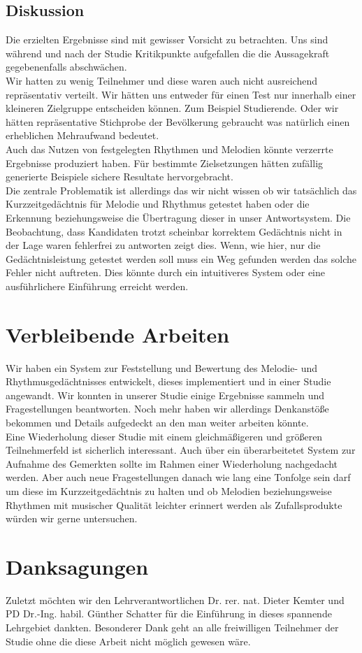 \documentclass{acm_proc_article-sp}
\begin{document}
\subsection{Diskussion}
Die erzielten Ergebnisse sind mit gewisser Vorsicht zu betrachten. Uns sind während und nach der Studie Kritikpunkte aufgefallen die die Aussagekraft gegebenenfalls abschwächen.\\
Wir hatten zu wenig Teilnehmer und diese waren auch nicht ausreichend repräsentativ verteilt. Wir hätten uns entweder für einen Test nur innerhalb einer kleineren Zielgruppe entscheiden können. Zum Beispiel Studierende. Oder wir hätten repräsentative Stichprobe der Bevölkerung gebraucht was natürlich einen erheblichen Mehraufwand bedeutet.\\
Auch das Nutzen von festgelegten Rhythmen und Melodien könnte verzerrte Ergebnisse produziert haben. Für bestimmte Zielsetzungen hätten zufällig generierte Beispiele sichere Resultate hervorgebracht.\\
Die zentrale Problematik ist allerdings das wir nicht wissen ob wir tatsächlich das Kurzzeitgedächtnis für Melodie und Rhythmus getestet haben oder die Erkennung beziehungsweise die Übertragung dieser in unser Antwortsystem. Die Beobachtung, dass Kandidaten trotzt scheinbar korrektem Gedächtnis nicht in der Lage waren fehlerfrei zu antworten zeigt dies. Wenn, wie hier, nur die Gedächtnisleistung getestet werden soll muss ein Weg gefunden werden das solche Fehler nicht auftreten. Dies könnte durch ein intuitiveres System oder eine ausführlichere Einführung erreicht werden.\\

\section{Verbleibende Arbeiten}
Wir haben ein System zur Feststellung und Bewertung des Melodie- und Rhythmusgedächtnisses entwickelt, dieses implementiert und in einer Studie angewandt.  
Wir konnten in unserer Studie einige Ergebnisse sammeln und Fragestellungen beantworten. Noch mehr haben wir allerdings Denkanstöße bekommen und Details aufgedeckt an den man weiter arbeiten könnte.\\
Eine Wiederholung dieser Studie mit einem gleichmäßigeren und größeren Teilnehmerfeld ist sicherlich interessant. Auch über ein überarbeitetet System zur Aufnahme des Gemerkten sollte im Rahmen einer Wiederholung nachgedacht werden. Aber auch neue Fragestellungen danach wie lang eine Tonfolge sein darf um diese im Kurzzeitgedächtnis zu halten und ob Melodien beziehungsweise Rhythmen mit musischer Qualität leichter erinnert werden als Zufallsprodukte würden wir gerne untersuchen.

\section{Danksagungen}
Zuletzt möchten wir den Lehrverantwortlichen Dr. rer. nat. Dieter Kemter und PD Dr.-Ing. habil. Günther Schatter für die Einführung in dieses spannende Lehrgebiet dankten. Besonderer Dank geht an alle freiwilligen Teilnehmer der Studie ohne die diese Arbeit nicht möglich gewesen wäre.

\printbibliography
\end{document}
